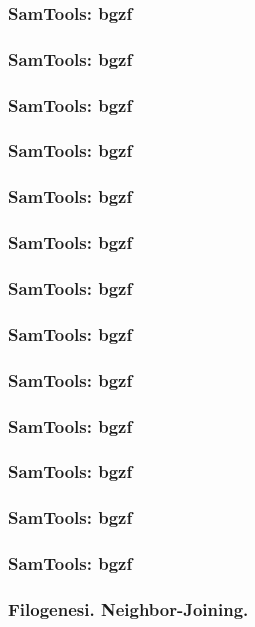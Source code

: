 \begin{frame}[fragile]
\frametitle{SamTools: bgzf}

\end{frame}
\begin{frame}[fragile]
\frametitle{SamTools: bgzf}

\end{frame}
\begin{frame}[fragile]
\frametitle{SamTools: bgzf}

\end{frame}
\begin{frame}[fragile]
\frametitle{SamTools: bgzf}

\end{frame}
\begin{frame}[fragile]
\frametitle{SamTools: bgzf}

\end{frame}
\begin{frame}[fragile]
\frametitle{SamTools: bgzf}

\end{frame}
\begin{frame}[fragile]
\frametitle{SamTools: bgzf}

\end{frame}
\begin{frame}[fragile]
\frametitle{SamTools: bgzf}

\end{frame}
\begin{frame}[fragile]
\frametitle{SamTools: bgzf}

\end{frame}
\begin{frame}[fragile]
\frametitle{SamTools: bgzf}

\end{frame}
\begin{frame}[fragile]
\frametitle{SamTools: bgzf}

\end{frame}
\begin{frame}[fragile]
\frametitle{SamTools: bgzf}

\end{frame}
\begin{frame}[fragile]
\frametitle{SamTools: bgzf}

\end{frame}



\begin{frame}[fragile]
\frametitle{Filogenesi. Neighbor-Joining.}
\end{frame}

